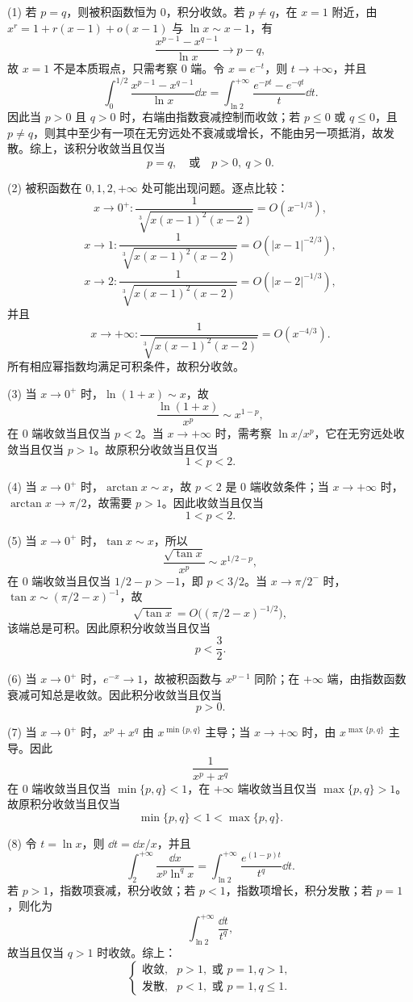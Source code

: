 \begin{solution}
	(1) 若 $p=q$，则被积函数恒为 $0$，积分收敛。若 $p\neq q$，在 $x=1$ 附近，由 $x^r=1+r(x-1)+o(x-1)$ 与 $\ln x\sim x-1$，有
	\[
	\frac{x^{p-1}-x^{q-1}}{\ln x}\to p-q,
	\]
	故 $x=1$ 不是本质瑕点，只需考察 $0$ 端。令 $x=e^{-t}$，则 $t\to+\infty$，并且
	\[
	\int_0^{1/2}\frac{x^{p-1}-x^{q-1}}{\ln x}\dd x
	=\int_{\ln2}^{+\infty}\frac{e^{-pt}-e^{-qt}}{t}\dd t.
	\]
	因此当 $p>0$ 且 $q>0$ 时，右端由指数衰减控制而收敛；若 $p\leq0$ 或 $q\leq0$，且 $p\neq q$，则其中至少有一项在无穷远处不衰减或增长，不能由另一项抵消，故发散。综上，该积分收敛当且仅当
	\[
	p=q,
	\quad\text{或}\quad
	p>0,\ q>0.
	\]
	
	(2) 被积函数在 $0,1,2,+\infty$ 处可能出现问题。逐点比较：
	\[
	x\to0^+:\frac1{\sqrt[3]{x(x-1)^2(x-2)}}=O(x^{-1/3}),
	\]
	\[
	x\to1:\frac1{\sqrt[3]{x(x-1)^2(x-2)}}=O(|x-1|^{-2/3}),
	\]
	\[
	x\to2:\frac1{\sqrt[3]{x(x-1)^2(x-2)}}=O(|x-2|^{-1/3}),
	\]
	并且
	\[
	x\to+\infty:\frac1{\sqrt[3]{x(x-1)^2(x-2)}}=O(x^{-4/3}).
	\]
	所有相应幂指数均满足可积条件，故积分收敛。
	
	(3) 当 $x\to0^+$ 时，$\ln(1+x)\sim x$，故
	\[
	\frac{\ln(1+x)}{x^p}\sim x^{1-p},
	\]
	在 $0$ 端收敛当且仅当 $p<2$。当 $x\to+\infty$ 时，需考察 $\ln x/x^p$，它在无穷远处收敛当且仅当 $p>1$。故原积分收敛当且仅当
	\[
	1<p<2.
	\]
	
	(4) 当 $x\to0^+$ 时，$\arctan x\sim x$，故 $p<2$ 是 $0$ 端收敛条件；当 $x\to+\infty$ 时，$\arctan x\to\pi/2$，故需要 $p>1$。因此收敛当且仅当
	\[
	1<p<2.
	\]
	
	(5) 当 $x\to0^+$ 时，$\tan x\sim x$，所以
	\[
	\frac{\sqrt{\tan x}}{x^p}\sim x^{1/2-p},
	\]
	在 $0$ 端收敛当且仅当 $1/2-p>-1$，即 $p<3/2$。当 $x\to\pi/2^-$ 时，$\tan x\sim(\pi/2-x)^{-1}$，故
	\[
	\sqrt{\tan x}=O\bigl((\pi/2-x)^{-1/2}\bigr),
	\]
	该端总是可积。因此原积分收敛当且仅当
	\[
	p<\frac32.
	\]
	
	(6) 当 $x\to0^+$ 时，$e^{-x}\to1$，故被积函数与 $x^{p-1}$ 同阶；在 $+\infty$ 端，由指数函数衰减可知总是收敛。因此积分收敛当且仅当
	\[
	p>0.
	\]
	
	(7) 当 $x\to0^+$ 时，$x^p+x^q$ 由 $x^{\min\{p,q\}}$ 主导；当 $x\to+\infty$ 时，由 $x^{\max\{p,q\}}$ 主导。因此
	\[
	\frac1{x^p+x^q}
	\]
	在 $0$ 端收敛当且仅当 $\min\{p,q\}<1$，在 $+\infty$ 端收敛当且仅当 $\max\{p,q\}>1$。故原积分收敛当且仅当
	\[
	\min\{p,q\}<1<\max\{p,q\}.
	\]
	
	(8) 令 $t=\ln x$，则 $\dd t=\dd x/x$，并且
	\[
	\int_2^{+\infty}\frac{\dd x}{x^p\ln^qx}
	=\int_{\ln2}^{+\infty}\frac{e^{(1-p)t}}{t^q}\dd t.
	\]
	若 $p>1$，指数项衰减，积分收敛；若 $p<1$，指数项增长，积分发散；若 $p=1$，则化为
	\[
	\int_{\ln2}^{+\infty}\frac{\dd t}{t^q},
	\]
	故当且仅当 $q>1$ 时收敛。综上：
	\[
	\begin{cases}
		\text{收敛},& p>1,\text{ 或 }p=1,q>1,\\
		\text{发散},& p<1,\text{ 或 }p=1,q\leq1.
	\end{cases}
	\]
\end{solution}



